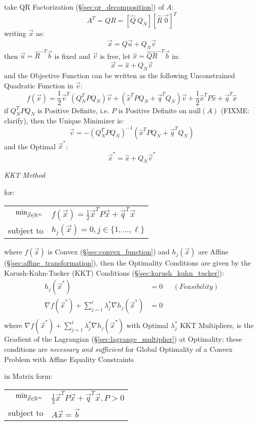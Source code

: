 take QR Factorization (\S\ref{sec:qr_decomposition}) of $A$:
\[
  A^T = QR = [\hat{Q} \ Q_N] [\hat{R} \ \vec{0}]^T
\]
writing $\vec{x}$ as:
\[
  \vec{x} = \hat{Q}\vec{u} + Q_N\vec{v}
\]
then $\vec{u} = \hat{R}^{-T}\vec{b}$ is fixed and $\vec{v}$ is free,
let $\hat{x} = \hat{Q}\hat{R}^{-T}\vec{b}$ in:
\[
  \vec{x} = \hat{x} + Q_N\vec{v}
\]
and the Objective Function can be written as the following Unconstrained
Quadratic Function in $\vec{v}$:
\[
  f(\vec{x}) = \frac{1}{2}\vec{v}^T(Q_N^T P Q_N)\vec{v} +
    (\hat{x}^T PQ_N + \vec{q}^T Q_N)\vec{v} +
    \frac{1}{2}\hat{x}^T P\hat{x} + \vec{q}^T\hat{x}
\]
if $Q_N^T P Q_N$ is Positive Definite, i.e. $P$ is Positive Definite on
$\mathrm{null}(A)$ (FIXME: clarify), then the Unique Minimizer is:
\[
  \vec{v} = -(Q_N^T P Q_N)^{-1}(\hat{x}^T P Q_N + \vec{q}^T Q_N)
\]
and the Optimal $\vec{x}^*$:
\[
  \vec{x}^* = \hat{x} + Q_N\vec{v}^*
\]


\emph{KKT Method}

for:

\begin{tabular}{r l}
  $\mathrm{min}_{\vec{\vec{x}} \in \mathbb{R}^m}$ &
    $f(\vec{x}) = \frac{1}{2}\vec{x}^T P\vec{x} + \vec{q}^T\vec{x}$ \\
  subject to & $h_j(\vec{x}) = 0, j \in \{1,\ldots,\ell\}$ \\
\end{tabular}

where $f(\vec{x})$ is Convex (\S\ref{sec:convex_function}) and $h_j(\vec{x})$
are Affine (\S\ref{sec:affine_transformation}),
then the Optimality Conditions are given by the Karush-Kuhn-Tucker (KKT)
Conditions (\S\ref{sec:karush_kuhn_tucker}):
\begin{align*}
  h_j(\vec{x}^*) & = 0 & \ \ \ (Feasibility) \\
  \nabla f(\vec{x}^*) +
    \sum_{j=1}^\ell \lambda_j^* \nabla h_j(\vec{x}^*) & = 0 & \\
\end{align*}
where $\nabla f(\vec{x}^*) + \sum_{j=1}^\ell \lambda^*_j \nabla h_j(\vec{x}^*)$
with Optimal $\lambda^*_j$ KKT Multipliers, is the Gradient of the Lagrangian
(\S\ref{sec:lagrange_multiplier}) at Optimality;
these conditions are \emph{necessary and sufficient} for Global Optimality of a
Convex Problem with Affine Equality Constraints

in Matrix form:

\begin{tabular}{r l}
  $\mathrm{min}_{\vec{\vec{x}} \in \mathbb{R}^m}$ &
    $\frac{1}{2}\vec{x}^T P\vec{x} + \vec{q}^T\vec{x}, P > 0$ \\
  subject to & $A\vec{x} = \vec{b}$ \\
\end{tabular}

